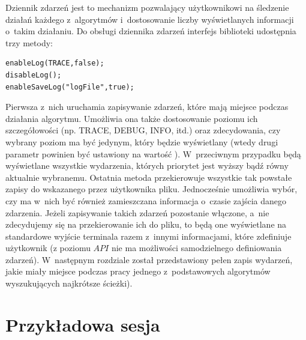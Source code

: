 Dziennik zdarzeń jest to mechanizm pozwalający użytkownikowi na śledzenie działań każdego z~algorytmów i~dostosowanie liczby wyświetlanych informacji o~takim działaniu.
Do obsługi dziennika zdarzeń interfejs biblioteki udostępnia trzy metody:
\begin{lstlisting}[style=customc]
enableLog(TRACE,false);
disableLog();
enableSaveLog("logFile",true);
\end{lstlisting}
Pierwsza z~nich uruchamia zapisywanie zdarzeń, które mają miejsce podczas działania algorytmu.
Umożliwia ona także dostosowanie poziomu ich szczegółowości (np. \textsc{TRACE}, \textsc{DEBUG}, \textsc{INFO}, itd.) oraz zdecydowania, czy wybrany poziom ma być jedynym, który będzie wyświetlany (wtedy drugi parametr powinien być ustawiony na wartość \KwTrue).
W~przeciwnym przypadku będą wyświetlane wszystkie wydarzenia, których priorytet jest wyższy bądź równy aktualnie wybranemu.
Ostatnia metoda przekierowuje wszystkie tak powstałe zapisy do wskazanego przez użytkownika pliku.
Jednocześnie umożliwia wybór, czy ma w~nich być również zamieszczana informacja o~czasie zajścia danego zdarzenia.
Jeżeli zapisywanie takich zdarzeń pozostanie włączone, a~nie zdecydujemy się na przekierowanie ich do pliku, to będą one wyświetlane na standardowe wyjście terminala razem z~innymi informacjami, które zdefiniuje użytkownik (z poziomu $API$ nie ma możliwości samodzielnego definiowania zdarzeń).
W~następnym rozdziale został przedstawiony pełen zapis wydarzeń, jakie miały miejsce podczas pracy jednego z~podstawowych algorytmów wyszukujących najkrótsze ścieżki).

\newpage



\section{Przykładowa sesja}




